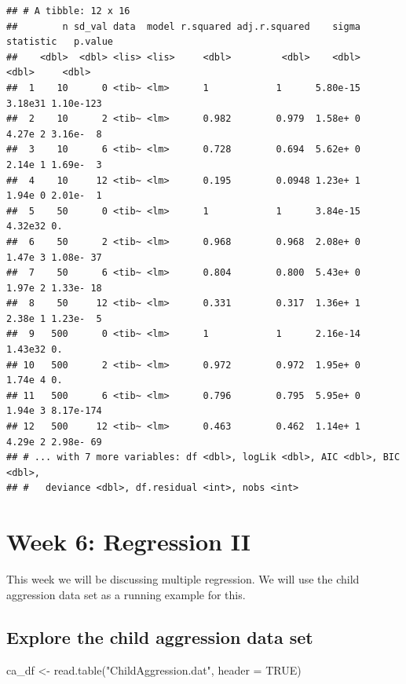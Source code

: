 \documentclass[
]{book}
\newenvironment{Shaded}{\begin{snugshade}}{\end{snugshade}}
\newcommand{\AttributeTok}[1]{\textcolor[rgb]{0.77,0.63,0.00}{#1}}
\newcommand{\ConstantTok}[1]{\textcolor[rgb]{0.00,0.00,0.00}{#1}}
\newcommand{\FunctionTok}[1]{\textcolor[rgb]{0.00,0.00,0.00}{#1}}
\newcommand{\NormalTok}[1]{#1}
\newcommand{\OtherTok}[1]{\textcolor[rgb]{0.56,0.35,0.01}{#1}}
\newcommand{\StringTok}[1]{\textcolor[rgb]{0.31,0.60,0.02}{#1}}
\begin{document}
\begin{verbatim}
## # A tibble: 12 x 16
##        n sd_val data  model r.squared adj.r.squared    sigma statistic   p.value
##    <dbl>  <dbl> <lis> <lis>     <dbl>         <dbl>    <dbl>     <dbl>     <dbl>
##  1    10      0 <tib~ <lm>      1            1      5.80e-15   3.18e31 1.10e-123
##  2    10      2 <tib~ <lm>      0.982        0.979  1.58e+ 0   4.27e 2 3.16e-  8
##  3    10      6 <tib~ <lm>      0.728        0.694  5.62e+ 0   2.14e 1 1.69e-  3
##  4    10     12 <tib~ <lm>      0.195        0.0948 1.23e+ 1   1.94e 0 2.01e-  1
##  5    50      0 <tib~ <lm>      1            1      3.84e-15   4.32e32 0.       
##  6    50      2 <tib~ <lm>      0.968        0.968  2.08e+ 0   1.47e 3 1.08e- 37
##  7    50      6 <tib~ <lm>      0.804        0.800  5.43e+ 0   1.97e 2 1.33e- 18
##  8    50     12 <tib~ <lm>      0.331        0.317  1.36e+ 1   2.38e 1 1.23e-  5
##  9   500      0 <tib~ <lm>      1            1      2.16e-14   1.43e32 0.       
## 10   500      2 <tib~ <lm>      0.972        0.972  1.95e+ 0   1.74e 4 0.       
## 11   500      6 <tib~ <lm>      0.796        0.795  5.95e+ 0   1.94e 3 8.17e-174
## 12   500     12 <tib~ <lm>      0.463        0.462  1.14e+ 1   4.29e 2 2.98e- 69
## # ... with 7 more variables: df <dbl>, logLik <dbl>, AIC <dbl>, BIC <dbl>,
## #   deviance <dbl>, df.residual <int>, nobs <int>
\end{verbatim}

\hypertarget{week-6-regression-ii}{%
\chapter{Week 6: Regression II}\label{week-6-regression-ii}}

This week we will be discussing multiple regression. We will use the child aggression data set as a running example for this.

\hypertarget{explore-the-child-aggression-data-set}{%
\section{Explore the child aggression data set}\label{explore-the-child-aggression-data-set}}

\begin{Shaded}
\begin{Highlighting}[]
\NormalTok{ca\_df }\OtherTok{\textless{}{-}} \FunctionTok{read.table}\NormalTok{(}\StringTok{"ChildAggression.dat"}\NormalTok{, }\AttributeTok{header =} \ConstantTok{TRUE}\NormalTok{)}
\end{Highlighting}
\end{Shaded}
\end{document}
